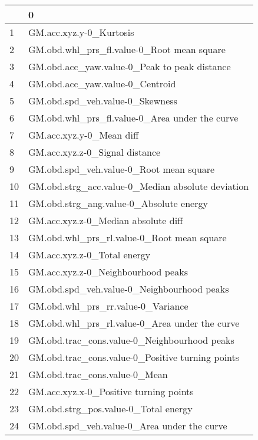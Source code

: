 \begin{tabular}{ll}
\toprule
{} &                                                  0 \\
\midrule
1   &                            GM.acc.xyz.y-0\_Kurtosis \\
2   &         GM.obd.whl\_prs\_fl.value-0\_Root mean square \\
3   &       GM.obd.acc\_yaw.value-0\_Peak to peak distance \\
4   &                    GM.obd.acc\_yaw.value-0\_Centroid \\
5   &                    GM.obd.spd\_veh.value-0\_Skewness \\
6   &     GM.obd.whl\_prs\_fl.value-0\_Area under the curve \\
7   &                           GM.acc.xyz.y-0\_Mean diff \\
8   &                     GM.acc.xyz.z-0\_Signal distance \\
9   &            GM.obd.spd\_veh.value-0\_Root mean square \\
10  &  GM.obd.strg\_acc.value-0\_Median absolute deviation \\
11  &            GM.obd.strg\_ang.value-0\_Absolute energy \\
12  &                GM.acc.xyz.z-0\_Median absolute diff \\
13  &         GM.obd.whl\_prs\_rl.value-0\_Root mean square \\
14  &                        GM.acc.xyz.z-0\_Total energy \\
15  &                 GM.acc.xyz.z-0\_Neighbourhood peaks \\
16  &         GM.obd.spd\_veh.value-0\_Neighbourhood peaks \\
17  &                 GM.obd.whl\_prs\_rr.value-0\_Variance \\
18  &     GM.obd.whl\_prs\_rl.value-0\_Area under the curve \\
19  &       GM.obd.trac\_cons.value-0\_Neighbourhood peaks \\
20  &   GM.obd.trac\_cons.value-0\_Positive turning points \\
21  &                      GM.obd.trac\_cons.value-0\_Mean \\
22  &             GM.acc.xyz.x-0\_Positive turning points \\
23  &               GM.obd.strg\_pos.value-0\_Total energy \\
24  &        GM.obd.spd\_veh.value-0\_Area under the curve \\

\end{tabular}

